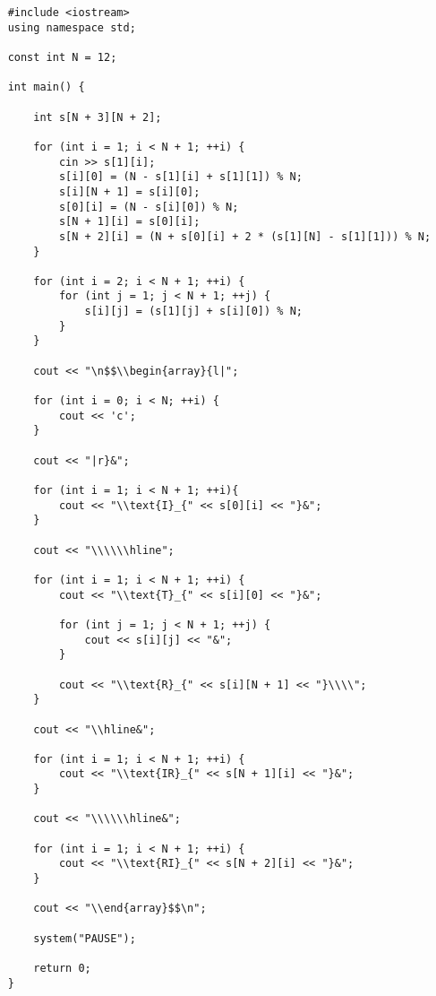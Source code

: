 		\newpage
		\begin{lstlisting}
	#include <iostream>
	using namespace std;
	
	const int N = 12;
	
	int main() {
	
		int s[N + 3][N + 2];
	
		for (int i = 1; i < N + 1; ++i) {
			cin >> s[1][i];
			s[i][0] = (N - s[1][i] + s[1][1]) % N;
			s[i][N + 1] = s[i][0];
			s[0][i] = (N - s[i][0]) % N;
			s[N + 1][i] = s[0][i];
			s[N + 2][i] = (N + s[0][i] + 2 * (s[1][N] - s[1][1])) % N;
		}
	
		for (int i = 2; i < N + 1; ++i) {
			for (int j = 1; j < N + 1; ++j) {
				s[i][j] = (s[1][j] + s[i][0]) % N;
			}
		}
	
		cout << "\n$$\\begin{array}{l|";
		
		for (int i = 0; i < N; ++i) {
			cout << 'c';
		}
		
		cout << "|r}&";
	
		for (int i = 1; i < N + 1; ++i){
			cout << "\\text{I}_{" << s[0][i] << "}&";
		}
		
		cout << "\\\\\\hline";
	
		for (int i = 1; i < N + 1; ++i) {
			cout << "\\text{T}_{" << s[i][0] << "}&";
			
			for (int j = 1; j < N + 1; ++j) {
				cout << s[i][j] << "&";
			}
			
			cout << "\\text{R}_{" << s[i][N + 1] << "}\\\\";
		}
	
		cout << "\\hline&";
		
		for (int i = 1; i < N + 1; ++i) {
			cout << "\\text{IR}_{" << s[N + 1][i] << "}&";
		}
	
		cout << "\\\\\\hline&";
		
		for (int i = 1; i < N + 1; ++i) {
			cout << "\\text{RI}_{" << s[N + 2][i] << "}&";
		}
	
		cout << "\\end{array}$$\n";
	
		system("PAUSE");
	
		return 0;
	}


	\end{lstlisting}